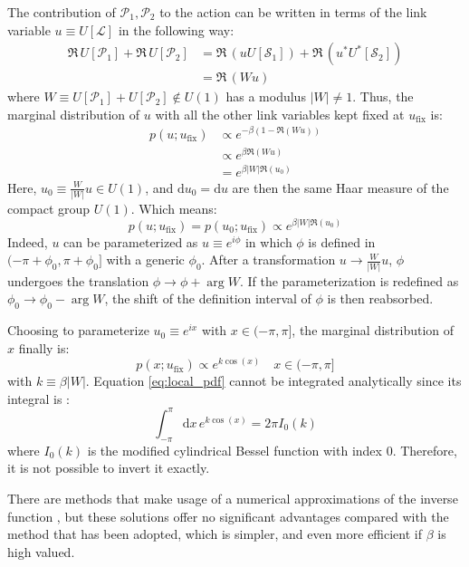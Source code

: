 The contribution of $\mathcal P_1, \mathcal P_2$ to the action can be written in terms of
the link variable $u \equiv U[\mathcal L]$ in the following way:
\[\begin{aligned}
    \Re\,U[\mathcal P_1] + \Re\,U[\mathcal P_2] &= \Re\,(uU[\mathcal S_1]) + \Re\,(u^*U^*[\mathcal S_2]) \\
                                                &= \Re\,(Wu)
\end{aligned}\]
where $W \equiv U[\mathcal P_1] + U[\mathcal P_2] \notin U(1)$ has a modulus $|W|\neq1$.
Thus, the marginal distribution of $u$ with all the other link variables kept fixed at $u_\mathrm{fix}$ is:
\[\begin{aligned}
    p(u;u_\mathrm{fix}) &\propto e^{-\beta(1-\Re(Wu))} \\
                        &\propto e^{\beta\Re(Wu)} \\
                        &= e^{\beta|W|\Re\left(u_0\right)}
\end{aligned}\]
Here, $u_0 \equiv \frac{W}{|W|}u \in U(1)$, and $\mathrm du_0=\mathrm du$ are then the same Haar measure of the compact group $U(1)$.
Which means:
\[
    p(u;u_\mathrm{fix}) = p(u_0;u_\mathrm{fix}) \propto e^{\beta|W|\Re\left(u_0\right)}
\]
Indeed, $u$ can be parameterized as $u\equiv e^{i\phi}$ in which $\phi$ is defined in $(-\pi + \phi_0, \pi + \phi_0]$ with a generic $\phi_0$.
After a transformation $u \rightarrow \frac{W}{|W|}u$, $\phi$ undergoes the translation $\phi \rightarrow \phi + \arg W$.
If the parameterization is redefined as $\phi_0 \rightarrow \phi_0 - \arg W$, the shift of the definition interval of $\phi$ is then reabsorbed.

Choosing to parameterize $u_0 \equiv e^{ix}$ with $x \in (-\pi, \pi]$,
the marginal distribution of $x$ finally is:
\begin{equation}\label{eq:local_pdf}
    p(x;u_\mathrm{fix}) \propto e^{k\cos(x)} \quad x \in (-\pi, \pi]
\end{equation}
with $k \equiv \beta|W|$.
Equation \eqref{eq:local_pdf} cannot be integrated analytically since its integral is \cite{nist:2010}:
\[
    \int_{-\pi}^{\pi}\mathrm dx\,e^{k\cos(x)} = 2\pi I_0(k)
\]
where $I_0(k)$ is the modified cylindrical Bessel function with index $0$.
Therefore, it is not possible to invert it exactly.

There are methods that make usage of a numerical approximations of the inverse function \cite{bazavov:2005},
but these solutions offer no significant advantages compared with the method that has been adopted,
which is simpler, and even more efficient if $\beta$ is high valued.

